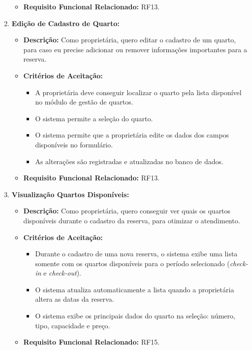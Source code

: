 \documentclass[
	12pt,				%
	openany,			%
	oneside,			%
	a4paper,			%
	english,			%
	french,				%
	spanish,			%
	brazil				%
	]{abntex2}
\begin{document}
\begin{enumerate}[label=\textbf{\arabic*.}]
\begin{itemize}
\begin{itemize}
		\end{itemize}
		\item \textbf{Requisito Funcional Relacionado:} RF13.
	\end{itemize} 
	\item \textbf{Edição de Cadastro de Quarto:}
	\begin{itemize}
		\item \textbf{Descrição:} Como proprietária, quero editar o cadastro de um quarto, para caso eu precise adicionar ou remover informações importantes para a reserva.
		\item \textbf{Critérios de Aceitação:}
		\begin{itemize}
			\item A proprietária deve conseguir localizar o quarto pela lista disponível no módulo de gestão de quartos.
			\item O sistema permite a seleção do quarto.
			\item O sistema permite que a proprietária edite os dados dos campos disponíveis no formulário.
			\item As alterações são registradas e atualizadas no banco de dados.
		\end{itemize}
		\item \textbf{Requisito Funcional Relacionado:} RF13.
	\end{itemize} 
	\item \textbf{Visualização Quartos Disponíveis:}
	\begin{itemize}
		\item \textbf{Descrição:} Como proprietária, quero conseguir ver quais os quartos disponíveis durante o cadastro da reserva, para otimizar o atendimento.
		\item \textbf{Critérios de Aceitação:}
		\begin{itemize}
			\item Durante o cadastro de uma nova reserva, o sistema exibe uma lista somente com os quartos disponíveis para o período selecionado (\textit{check-in} e \textit{check-out}).
			\item O sistema atualiza automaticamente a lista quando a proprietária altera as datas da reserva.
			\item O sistema exibe os principais dados do quarto na seleção: número, tipo, capacidade e preço.
		\end{itemize}
		\item \textbf{Requisito Funcional Relacionado:} RF15.
	\end{itemize} 

\end{enumerate}
\end{document}
